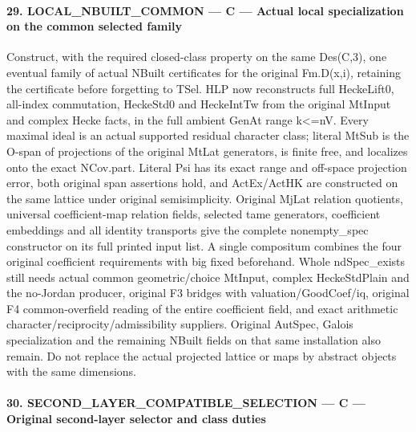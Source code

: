 \paragraph{29. LOCAL\_\allowbreak{}NBUILT\_\allowbreak{}COMMON — C — Actual local specialization on the common selected family}

Construct, with the required closed-class property on the same Des(C,3), one eventual family of actual NBuilt certificates for the original Fm.D(x,i), retaining the certificate before forgetting to TSel. HLP now reconstructs full HeckeLift0, all-index commutation, HeckeStd0 and HeckeIntTw from the original MtInput and complex Hecke facts, in the full ambient GenAt range k<=nV. Every maximal ideal is an actual supported residual character class; literal MtSub is the O-span of projections of the original MtLat generators, is finite free, and localizes onto the exact NCov.part. Literal Psi has its exact range and off-space projection error, both original span assertions hold, and ActEx/\allowbreak{}ActHK are constructed on the same lattice under original semisimplicity. Original MjLat relation quotients, universal coefficient-map relation fields, selected tame generators, coefficient embeddings and all identity transports give the complete nonempty\_\allowbreak{}spec constructor on its full printed input list. A single compositum combines the four original coefficient requirements with big fixed beforehand. Whole ndSpec\_\allowbreak{}exists still needs actual common geometric/\allowbreak{}choice MtInput, complex HeckeStdPlain and the no-Jordan producer, original F3 bridges with valuation/\allowbreak{}GoodCoef/\allowbreak{}iq, original F4 common-overfield reading of the entire coefficient field, and exact arithmetic character/\allowbreak{}reciprocity/\allowbreak{}admissibility suppliers. Original AutSpec, Galois specialization and the remaining NBuilt fields on that same installation also remain. Do not replace the actual projected lattice or maps by abstract objects with the same dimensions.

\paragraph{30. SECOND\_\allowbreak{}LAYER\_\allowbreak{}COMPATIBLE\_\allowbreak{}SELECTION — C — Original second-layer selector and class duties}

